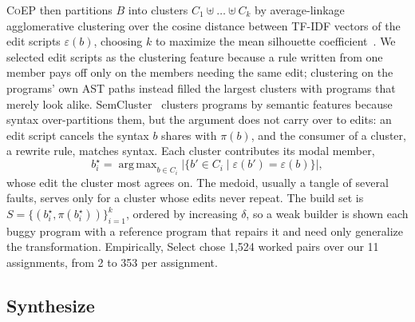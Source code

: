 \documentclass[acmsmall,screen,review,anonymous,nonacm]{acmart}
\DeclareMathOperator*{\argmax}{arg\,max}
\newcommand{\tool}{\textsc{CoEP}\xspace}
\begin{document}
\tool then partitions $B$ into clusters $C_1 \uplus \dots \uplus C_k$ by average-linkage agglomerative clustering over the cosine distance between TF-IDF vectors of the edit scripts $\varepsilon(b)$, choosing $k$ to maximize the mean silhouette coefficient~\cite{rousseeuw1987silhouettes}. We selected edit scripts as the clustering feature because a rule written from one member pays off only on the members needing the same edit; clustering on the programs' own AST paths instead filled the largest clusters with programs that merely look alike. SemCluster~\cite{perry2019semcluster} clusters programs by semantic features because syntax over-partitions them, but the argument does not carry over to edits: an edit script cancels the syntax $b$ shares with $\pi(b)$, and the consumer of a cluster, a rewrite rule, matches syntax. Each cluster contributes its modal member,
\[
b^{\star}_i = \argmax_{b \in C_i} \big|\{ b' \in C_i \mid \varepsilon(b') = \varepsilon(b) \}\big|,
\]
whose edit the cluster most agrees on. The medoid, usually a tangle of several faults, serves only for a cluster whose edits never repeat. The build set is $S = \{(b^{\star}_i, \pi(b^{\star}_i))\}_{i=1}^{k}$, ordered by increasing $\delta$, so a weak builder is shown each buggy program with a reference program that repairs it and need only generalize the transformation. Empirically, Select chose 1{,}524 worked pairs over our 11 assignments, from 2 to 353 per assignment.

\subsection{Synthesize}
\label{sec:synth}
\end{document}
